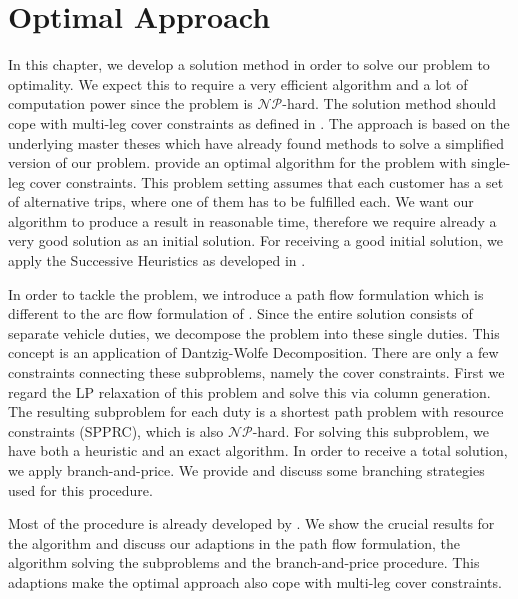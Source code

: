 \chapter{Optimal Approach}
\label{ch:optimal_approach}

In this chapter, we develop a solution method in order to solve our problem to optimality. We expect this to require a very efficient algorithm and a lot of computation power since the problem is $\mathcal{NP}$-hard. The solution method should cope with multi-leg cover constraints as defined in . The approach is based on the underlying master theses which have already found methods to solve a simplified version of our problem. \cite{Kaiser} provide an optimal algorithm for the problem with single-leg cover constraints. This problem setting assumes that each customer has a set of alternative trips, where one of them has to be fulfilled each. We want our algorithm to produce a result in reasonable time, therefore we require already a very good solution as an initial solution. For receiving a good initial solution, we apply the Successive Heuristics as developed in .

In order to tackle the problem, we introduce a path flow formulation which is different to the arc flow formulation of . Since the entire solution consists of separate vehicle duties, we decompose the problem into these single duties. This concept is an application of Dantzig-Wolfe Decomposition. There are only a few constraints connecting these subproblems, namely the cover constraints. First we regard the LP relaxation of this problem and solve this via column generation. The resulting subproblem for each duty is a shortest path problem with resource constraints (SPPRC), which is also $\mathcal{NP}$-hard. For solving this subproblem, we have both a heuristic and an exact algorithm. In order to receive a total solution, we apply branch-and-price. We provide and discuss some branching strategies used for this procedure.

Most of the procedure is already developed by \cite{Kaiser}. We show the crucial results for the algorithm and discuss our adaptions in the path flow formulation, the algorithm solving the subproblems and the branch-and-price procedure. This adaptions make the optimal approach also cope with multi-leg cover constraints.


